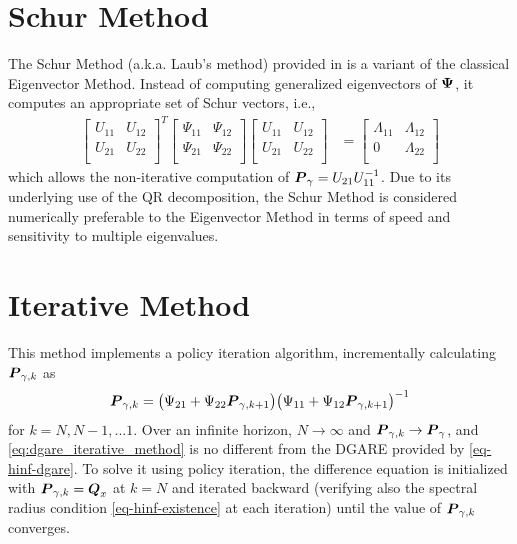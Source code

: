 \section{Schur Method}
\label{appendix:numerical:schur}
The Schur Method (a.k.a. Laub's method) provided in \cite{laub1979schur} is a variant of the classical Eigenvector Method.  Instead of computing generalized eigenvectors of $\vb*{\Psi}$, it computes an appropriate set of Schur vectors, i.e.,
\begin{equation}
\begin{aligned}
	\begin{bmatrix}
		U_{11} & U_{12}\\
		U_{21} & U_{22}\\
	\end{bmatrix}^{T}
	\begin{bmatrix}
		\Psi_{11} & \Psi_{12}\\
		\Psi_{21} & \Psi_{22}\\
	\end{bmatrix}
	\begin{bmatrix}
		U_{11} & U_{12}\\
		U_{21} & U_{22}\\
	\end{bmatrix} &=
	\begin{bmatrix}
		\Lambda_{11} & \Lambda_{12}\\
		0 & \Lambda_{22}\\
	\end{bmatrix}
\end{aligned}
\end{equation}
which allows the non-iterative computation of $\vb*{P}_{\gamma} = U_{21}U_{11}^{-1}$.  Due to its underlying use of the QR decomposition, the Schur Method is considered numerically preferable to the Eigenvector Method in terms of speed and sensitivity to multiple eigenvalues.

\section{Iterative Method}
\label{appendix:numerical:iterative}
This method implements a policy iteration algorithm, incrementally calculating $\vb*{P}_{\gamma,k}$ as
\begin{equation}
\label{eq:dgare_iterative_method}
\begin{aligned}
	\vb*{P}_{\gamma,k} &= \big{(} \Psi_{21} + \Psi_{22}\vb*{P}_{\gamma,k+1} \big{)}
		\big{(} \Psi_{11} + \Psi_{12}\vb*{P}_{\gamma,k+1} \big{)}^{-1}\\
\end{aligned}
\end{equation}
for $k = N, N-1, ... 1$.  Over an infinite horizon, $N \rightarrow \infty$ and  $\vb*{P}_{\gamma,k} \rightarrow \vb*{P}_{\gamma}$, and \eqref{eq:dgare_iterative_method} is no different from the DGARE provided by \eqref{eq-hinf-dgare}.  To solve it using policy iteration, the difference equation is initialized with $\vb*{P}_{\gamma,k} = \vb*{Q}_{x}$ at $k = N$ and iterated backward (verifying also the spectral radius condition \eqref{eq-hinf-existence} at each iteration) until the value of $\vb*{P}_{\gamma,k}$ converges.